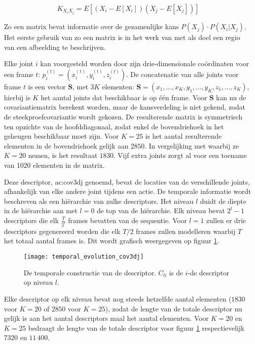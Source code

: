 $$K_{X_{i}X_{j}} = E[(X_i - E[X_i])(X_j - E[X_j])]$$

Zo een matrix bevat informatie over de gezamenlijke kans $P(X_j) \cdot P(X_i | X_j)$. Het eerste gebruik van zo een matrix is in het werk van \cite{Tuzel2006} met als doel een regio van een afbeelding te beschrijven.

Elke joint $i$ kan voorgesteld worden door zijn drie-dimensionale coördinaten voor een frame $t$: $p_i^{(t)} = (x_i^{(t)}, y_i^{(t)}, z_i^{(t)})$. De concatenatie van alle joints voor frame $t$ is een vector $\textbf{S}$, met $3K$ elementen: $\textbf{S} = (x_1, ..., x_K,y_1, ..., y_K,z_1, ..., z_K)$, hierbij is $K$ het aantal joints dat beschikbaar is op één frame. Voor $\textbf{S}$ kan nu de covariantiematrix berekent worden, maar de kansverdeling is niet gekend, zodat de steekproefcovariantie wordt gekozen. De resulterende matrix is symmetrisch ten opzichte van de hoofddiagonaal, zodat enkel de bovendriehoek in het geheugen beschikbaar moet zijn. Voor $K = 25$ is het aantal resulterende elementen in de bovendriehoek gelijk aan $2850$. In vergelijking met \cite{Hussein2011} waarbij ze $K = 20$ nemen, is het resultaat $1830$. Vijf extra joints zorgt al voor een toename van 1020 elementen in de matrix.

Deze descriptor, \gls{ac:cov3dj} genoemd, bevat de locaties van de verschillende joints, afhankelijk van elke andere joint tijdens een actie. De temporale informatie wordt beschreven als een hiërarchie van zulke descriptors. Het niveau $l$ duidt de diepte in de hiërarchie aan met $l = 0$ de top van de hiërarchie. Elk niveau bevat $2^l - 1$ descriptors die elk $\frac{T}{2^l}$ frames bevatten van de sequentie. Voor $l = 1$ zullen er drie descriptors gegenereerd worden die elk $T/2$ frames zullen modelleren waarbij $T$ het totaal aantal frames is. Dit wordt grafisch weergegeven op figuur \ref{fig:temporal_evolution_cov3dj}.

\begin{figure}
	\centering
	\texttt{[image: temporal\_evolution\_cov3dj]}
	\caption{De temporale constructie van de descriptor. $C_{li}$ is de $i$-de descriptor op niveau $l$. }
	\label{fig:temporal_evolution_cov3dj}
\end{figure}

Elke descriptor op elk niveau bevat nog steeds hetzelfde aantal elementen ($1830$ voor $K = 20$ of $2850$ voor $K = 25$), zodat de lengte van de totale descriptor nu gelijk is aan het aantal descriptors maal het aantal elementen. Voor $K = 20$ en $K = 25$ bedraagt de lengte van de totale descriptor voor figuur \ref{fig:temporal_evolution_cov3dj} respectievelijk $7320$ en $11\,400$.

